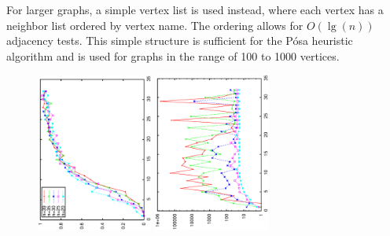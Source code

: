 \documentclass[twoside,11pt]{article}
\begin{document}
For larger graphs, a simple vertex list is used instead, where each vertex has a neighbor
list ordered by vertex name.
The ordering allows for $O(\lg(n))$ adjacency tests.  This simple structure is sufficient for the
P\'osa heuristic algorithm and is used for graphs in the range of 100 to 1000 vertices.


\begin{figure}
\centering
\includegraphics[width=0.34\textwidth,angle=-90]{ham_complete_prob_a0.5.ps}
\includegraphics[width=0.34\textwidth,angle=-90]{ham_complete_it_a0.5.ps}




\end{figure}
\end{document}
